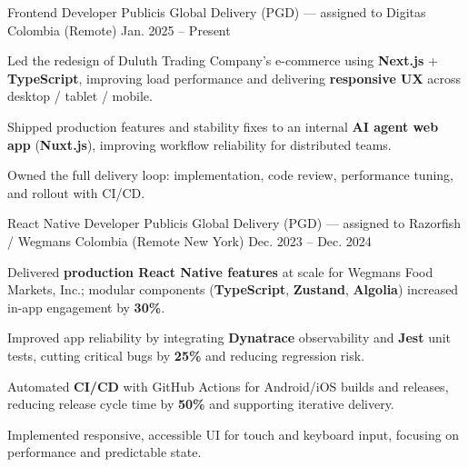 \newcommand{\quotes}[1]{``#1''}

\begin{cventries}

  \cventry
  {Frontend Developer}
  {Publicis Global Delivery (PGD) — assigned to Digitas}
  {Colombia (Remote)}
  {Jan. 2025 -- Present}
  {
    \begin{cvitems}
      \item {Led the redesign of Duluth Trading Company's e-commerce using \textbf{Next.js} + \textbf{TypeScript}, improving load performance and delivering \textbf{responsive UX} across desktop / tablet / mobile.}
      \item {Shipped production features and stability fixes to an internal \textbf{AI agent web app} (\textbf{Nuxt.js}), improving workflow reliability for distributed teams.}
      \item {Owned the full delivery loop: implementation, code review, performance tuning, and rollout with CI/CD.}
    \end{cvitems}
  }

  \cventry
  {React Native Developer}
  {Publicis Global Delivery (PGD) — assigned to Razorfish / Wegmans}
  {Colombia (Remote \textemdash{} New York)}
  {Dec. 2023 -- Dec. 2024}
  {
    \begin{cvitems}
      \item {Delivered \textbf{production React Native features} at scale for Wegmans Food Markets, Inc.; modular components (\textbf{TypeScript}, \textbf{Zustand}, \textbf{Algolia}) increased in-app engagement by \textbf{30\%}.}
      \item {Improved app reliability by integrating \textbf{Dynatrace} observability and \textbf{Jest} unit tests, cutting critical bugs by \textbf{25\%} and reducing regression risk.}
      \item {Automated \textbf{CI/CD} with GitHub Actions for Android/iOS builds and releases, reducing release cycle time by \textbf{50\%} and supporting iterative delivery.}
      \item {Implemented responsive, accessible UI for touch and keyboard input, focusing on performance and predictable state.}
    \end{cvitems}
  }


\end{cventries}
